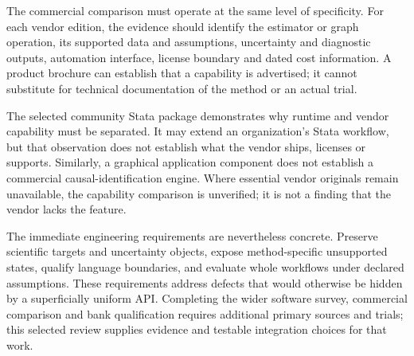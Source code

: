 The commercial comparison must operate at the same level of specificity.
For each vendor edition, the evidence should identify the estimator or graph
operation, its supported data and assumptions, uncertainty and diagnostic
outputs, automation interface, license boundary and dated cost information.
A product brochure can establish that a capability is advertised; it cannot
substitute for technical documentation of the method or an actual trial.

The selected community Stata package demonstrates why runtime and vendor
capability must be separated. It may extend an organization's Stata workflow,
but that observation does not establish what the vendor ships, licenses or
supports. Similarly, a graphical application component does not establish a
commercial causal-identification engine. Where essential vendor originals
remain unavailable, the capability comparison is unverified; it is not a
finding that the vendor lacks the feature.

The immediate engineering requirements are nevertheless concrete. Preserve
scientific targets and uncertainty objects, expose method-specific unsupported
states, qualify language boundaries, and evaluate whole workflows under
declared assumptions. These requirements address defects that would otherwise
be hidden by a superficially uniform API. Completing the wider software
survey, commercial comparison and bank qualification requires additional
primary sources and trials; this selected review supplies evidence and
testable integration choices for that work.
